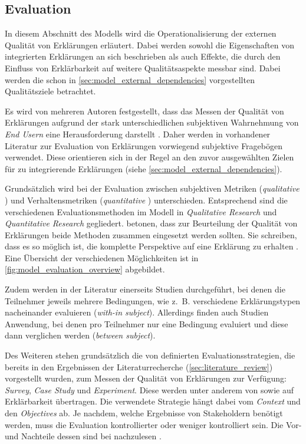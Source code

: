 \subsection{Evaluation}
\label{sec:model_evaluation_description}

In diesem Abschnitt des Modells wird die Operationalisierung der externen Qualität von Erklärungen erläutert. Dabei werden sowohl die Eigenschaften von integrierten Erklärungen an sich beschrieben als auch Effekte, die durch den Einfluss von Erklärbarkeit auf weitere Qualitätsaspekte messbar sind. Dabei werden die schon in \autoref{sec:model_external_dependencies} vorgestellten Qualitätsziele betrachtet.

Es wird von mehreren Autoren festgestellt, dass das Messen der Qualität von Erklärungen aufgrund der stark unterschiedlichen subjektiven Wahrnehmung von \textit{End Usern}  eine Herausforderung darstellt \cite{nunes_systematic_2017, eiband_impact_2019, kouki_user_2017}. Daher werden in vorhandener Literatur zur Evaluation von Erklärungen vorwiegend subjektive Fragebögen verwendet. Diese orientieren sich in der Regel an den zuvor ausgewählten Zielen für zu integrierende Erklärungen (siehe \autoref{sec:model_external_dependencies}).

Grundsätzlich wird bei der Evaluation zwischen subjektiven Metriken (\textit{qualitative} \cite{wohlin2012experimentation}) und Verhaltensmetriken (\textit{quantitative} \cite{wohlin2012experimentation}) unterschieden. Entsprechend sind die verschiedenen Evaluationsmethoden im Modell in \textit{Qualitative Research} und \textit{Quantitative Research} gegliedert. \citeauthor{waa_evaluating_2021} betonen, dass zur Beurteilung der Qualität von Erklärungen beide Methoden zusammen eingesetzt werden sollten. Sie schreiben, dass es so möglich ist, die \glqq komplette Perspektive\grqq{} auf eine Erklärung zu erhalten \cite[übersetzt vgl.][]{waa_evaluating_2021}. Eine Übersicht der verschiedenen Möglichkeiten ist in \autoref{fig:model_evaluation_overview} abgebildet.

Zudem werden in der Literatur einerseits Studien durchgeführt, bei denen die Teilnehmer jeweils mehrere Bedingungen, wie z.~B. verschiedene Erklärungstypen nacheinander evaluieren (\textit{with-in subject}). Allerdings finden auch Studien Anwendung, bei denen pro Teilnehmer nur eine Bedingung evaluiert und diese dann verglichen werden (\textit{between subject}).

Des Weiteren stehen grundsätzlich die von \citeauthor{wohlin2012experimentation} definierten Evaluationsstrategien, die bereits in den Ergebnissen der Literaturrecherche (\autoref{sec:literature_review}) vorgestellt wurden, zum Messen der Qualität von Erklärungen zur Verfügung: \textit{Survey}, \textit{Case Study} und \textit{Experiment}. Diese werden unter anderem von \citeauthor{ribera2019can} sowie \citeauthor{doshi2017towards} auf Erklärbarkeit übertragen. Die verwendete Strategie hängt dabei vom \textit{Context} und den \textit{Objectives} ab. Je nachdem, welche Ergebnisse von Stakeholdern benötigt werden, muss die Evaluation kontrollierter oder weniger kontrolliert sein. Die Vor- und Nachteile dessen sind bei \citeauthor{wohlin2012experimentation} nachzulesen \cite{wohlin2012experimentation}.

